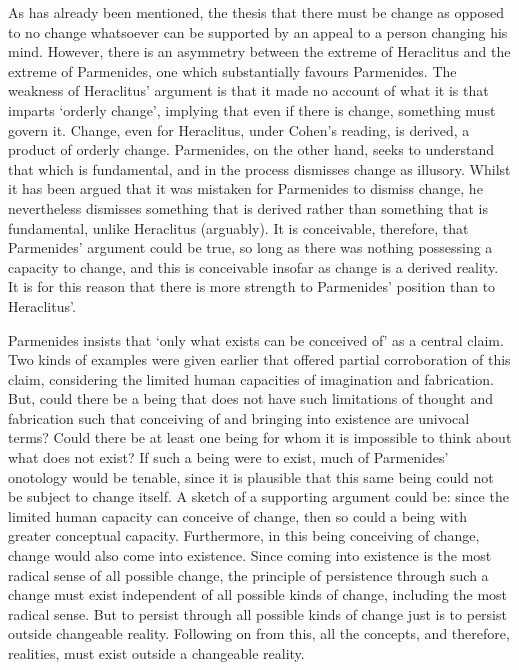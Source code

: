 As has already been mentioned, the thesis that there must be change as opposed to no change whatsoever can be supported by an appeal to a person changing his mind.
However, there is an asymmetry between the extreme of Heraclitus and the extreme of Parmenides, one which substantially favours Parmenides. The weakness of Heraclitus' argument is that it made no account of what it is that imparts `orderly change', implying that even if there is change, something must govern it. Change, even for Heraclitus, under Cohen's reading, is derived, a product of orderly change. Parmenides, on the other hand, seeks to understand that which is fundamental, and in the process dismisses change as illusory. Whilst it has been argued that it was mistaken for Parmenides to dismiss change, he nevertheless dismisses something that is derived rather than something that is fundamental, unlike Heraclitus (arguably). It is conceivable, therefore, that Parmenides' argument could be true, so long as there was nothing possessing a capacity to change, and this is conceivable insofar as change is a derived reality. It is for this reason that there is more strength to Parmenides' position than to Heraclitus'.

Parmenides insists that `only what exists can be conceived of' as a central claim. Two kinds of examples were given earlier that offered partial corroboration of this claim, considering the limited human capacities of imagination and fabrication. But, could there be a being that does not have such limitations of thought and fabrication such that conceiving of and bringing into existence are univocal terms? Could there be at least one being for whom it is impossible to think about what does not exist? If such a being were to exist, much of Parmenides' onotology would be tenable, since it is plausible that this same being could not be subject to change itself. A sketch of a supporting argument could be: since the limited human capacity can conceive of change, then so could a being with greater conceptual capacity. Furthermore, in this being conceiving of change, change would also come into existence. Since coming into existence is the most radical sense of all possible change, the principle of persistence through such a change must exist independent of all possible kinds of change, including the most radical sense. But to persist through all possible kinds of change just is to persist outside changeable reality. Following on from this, all the concepts, and therefore, realities, must exist outside a changeable reality.

